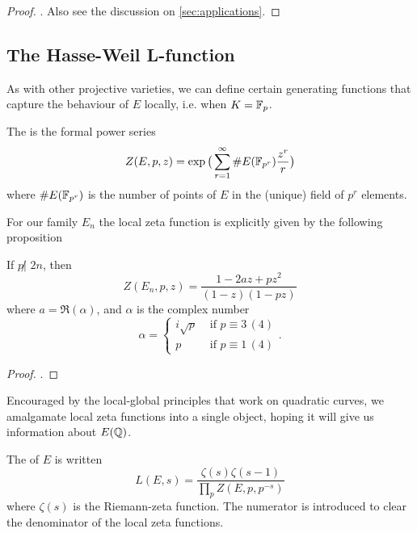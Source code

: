 \documentclass[12pt, a4paper]{amsart}
\begin{document}
\begin{proof}
  \cite[See][Chapter III, pages 63-88]{rational}. Also see the discussion on
  \autoref{sec:applications}.
\end{proof}


\subsection{The Hasse-Weil L-function}

As with other projective varieties, we can define certain generating functions
that capture the behaviour of $E$ locally, i.e. when $K = \mathbb{F}_p$.

\begin{defn}
  The  is the formal power series
  \[Z(E, p, z) = \exp \big( \sum\limits_{r=1}^{\infty} \# E(\mathbb{F}_{p^r}) \frac{z^r}{r} \big)\]
  where $\# E(\mathbb{F}_{p^r})$ is the number of points of $E$ in the (unique) field
  of $p^r$ elements.
\end{defn}

For our family $E_n$ the local zeta function is explicitly given by the
following proposition

\begin{prop}
  If $p \not| \,\, 2n$, then
  \[Z(E_n, p, z) = \frac{1 - 2az + pz^2}{(1-z)(1-pz)} \]
  where $a = \Re(\alpha)$, and $\alpha$ is the complex number
  \[ \alpha =
    \begin{cases}
      i \sqrt{p} & \text{ if } p \equiv 3 \, (4) \\
      p & \text{ if } p \equiv 1 \, (4)
    \end{cases}.\]
\end{prop}

\begin{proof}
  \cite[See][Chater II-2, pages 59-61]{modular}.
\end{proof}

Encouraged by the local-global principles that work on quadratic curves, we
amalgamate local zeta functions into a single object, hoping it will give us
information about $E({\mathbb Q})$.

\begin{defn}
  The  of $E$ is written
  \begin{equation} \label{eq:lfunction}
    L(E, s) = \frac{\zeta(s) \zeta(s-1)}{\prod_p Z(E, p, p^{-s})}
  \end{equation}
  where $\zeta(s)$ is the Riemann-zeta function. The numerator is introduced
  to clear the denominator of the local zeta functions.
\end{defn}
\end{document}
